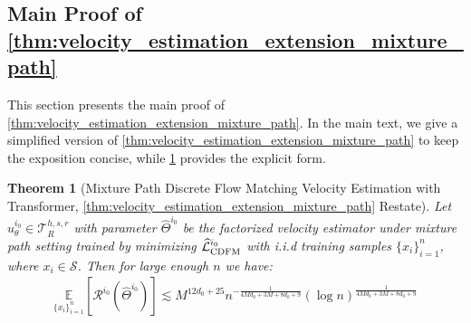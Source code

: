 \documentclass[12pt]{article}
\numberwithin{equation}{section}
\let\hat\widehat
\newcommand{\wh}{\widehat}
\renewcommand{\hat}{\wh}
\DeclareMathOperator*{\E}{{\mathbb{E}}}
\def\E{\mathbb{E}}
\theoremstyle{theoremstyle}
\newtheorem{theorem}{Theorem}[section]
\numberwithin{equation}{section}
\numberwithin{theorem}{section}
\numberwithin{proposition}{section}
\numberwithin{definition}{section}
\numberwithin{lemma}{section}
\numberwithin{assumption}{section}
\numberwithin{remark}{section}
\begin{document}
\subsection{Main Proof of \texorpdfstring{\cref{thm:velocity_estimation_extension_mixture_path}}{}}
\label{sec:main_proof_dfm_v_estimation_entention_mixture_path}

This section presents the main proof of \cref{thm:velocity_estimation_extension_mixture_path}.
In the main text, we give a simplified version of \cref{thm:velocity_estimation_extension_mixture_path} to keep the exposition concise, while \cref{thm:velocity_estimation_extension_mixture_path_re} provides the explicit form.


\begin{theorem}[Mixture Path Discrete Flow Matching Velocity Estimation with Transformer, \cref{thm:velocity_estimation_extension_mixture_path} Restate]
\label{thm:velocity_estimation_extension_mixture_path_re}
Let $\hat{u}^{i_0}_\theta\in\mathcal{T}^{h,s,r}_R$ with parameter $\hat{\Theta}^{i_0}$ be the factorized velocity estimator under mixture path setting trained by minimizing $\hat{\mathcal{L}}^{i_0}_{\rm CDFM}$ with i.i.d training samples $\{x_i\}_{i=1}^n$, where $x_i\in \mathcal{S}$.
Then for large enough $n$ we have:
\begin{align*}
    \underset{\{x_i\}_{i=1}^n}{\E}[\mathcal{R}^{i_0}(\hat{\Theta}^{i_0})] \lesssim M^{12d_0+25}n^{-\frac{ 1}{4Md_0+3M+8d_0+9}}(\log n)^{\frac{1}{4Md_0+3M+8d_0+9}}
\end{align*}
\end{theorem}
\end{document}
